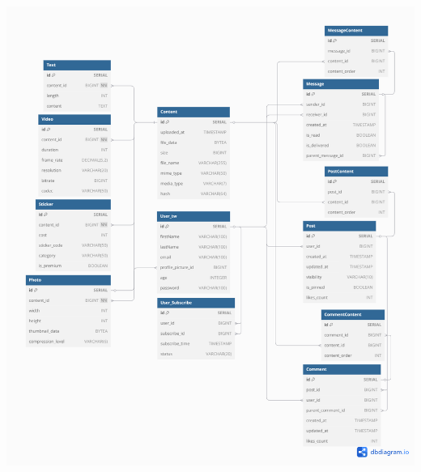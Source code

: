 \documentclass{article}
\begin{document}
\begin{center}
    \includegraphics[width=1\textwidth]{postgres.png}
\end{center}
\end{document}
